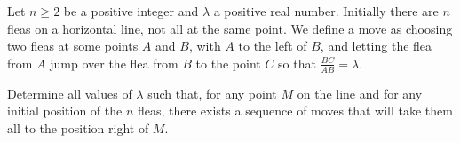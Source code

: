 Let $ n \geq 2$ be a positive integer and $ \lambda$ a positive real number. Initially there are $ n$ fleas on a horizontal line, not all at the same point. We define a move as choosing two fleas at some points $ A$ and $ B$,  with $ A$ to the left of $ B$,  and letting the flea from $ A$ jump over the flea from $ B$ to the point $ C$ so that $ \frac {BC}{AB} = \lambda$.

Determine all values of $ \lambda$ such that, for any point $ M$ on the line and for any initial position of the $ n$ fleas, there exists a sequence of moves that will take them all to the position right of $ M$.